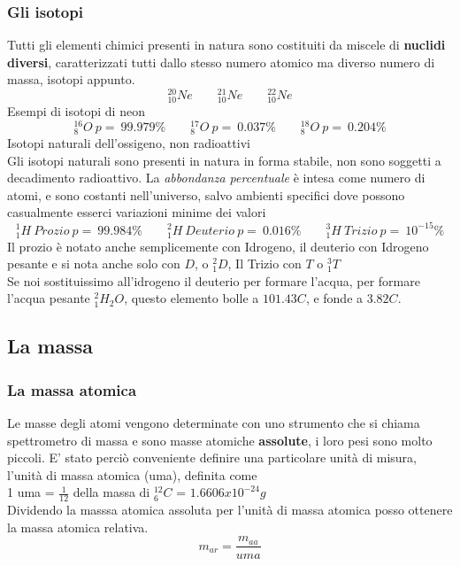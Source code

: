 \documentclass{article}
\begin{document}
\subsubsection{Gli isotopi}
Tutti gli elementi chimici presenti in natura sono costituiti da miscele di \textbf{nuclidi diversi},
caratterizzati tutti dallo stesso numero atomico ma diverso numero di massa, isotopi appunto.\\
\[
^{20}_{10}Ne \qquad ^{21}_{10}Ne \qquad^{22}_{10}Ne 
\]
Esempi di isotopi di neon
\[
^{16}_{8}O \ p= \ 99.979\% \qquad ^{17}_{8}O \ p= \ 0.037\%  \qquad^{18}_{8}O \ p= \ 0.204\%  
\]
Isotopi naturali dell'ossigeno, non radioattivi\\
Gli isotopi naturali sono presenti in natura in forma stabile, non sono soggetti a decadimento radioattivo.
La \textit{abbondanza percentuale} è intesa come numero di atomi, e sono costanti nell'universo, salvo ambienti specifici dove possono casualmente esserci variazioni minime dei valori
\[
^{1}_{1}H \ Prozio \ p= \ 99.984\% \qquad ^{2}_{1}H \ Deuterio\ p= \ 0.016\% 
 \qquad^{3}_{1}H \ Trizio \ p= \ 10^{-15}\% \]
Il prozio è notato anche semplicemente con Idrogeno, il deuterio con Idrogeno pesante e si nota anche solo con $D$, o $^2_1D$, Il Trizio con $T$ o $^3_1T$\\
Se noi sostituissimo all'idrogeno il deuterio per formare l'acqua, per formare l'acqua pesante $^2_1H_2O$, questo elemento bolle a $101.43C$, e fonde a $3.82C$.\\
\subsection{La massa}
\subsubsection{La massa atomica}
Le masse degli atomi vengono determinate con uno strumento che si chiama spettrometro di massa e sono masse atomiche \textbf{assolute},
i loro pesi sono molto piccoli.
E' stato perciò conveniente definire una particolare unità di misura, l'unità di massa atomica (uma), definita come \\
1 uma = $\frac{1}{12}$ della massa di $^{12}_6C$ = $1.6606 x 10^{-24}g$\\
Dividendo la masssa atomica assoluta per l'unità di massa atomica posso ottenere la massa atomica relativa.
\[m_{ar}= \frac{m_{aa}}{uma}\]
\end{document}
